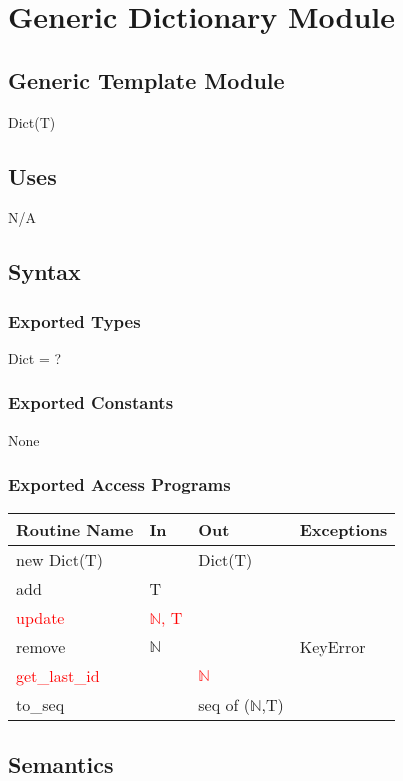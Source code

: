 \documentclass[12pt, titlepage]{article}
\begin{document}
\newpage

\section*{Generic Dictionary Module}

\subsection*{Generic Template Module}
Dict(T)

\subsection*{Uses}
N/A

\subsection*{Syntax}
\subsubsection*{Exported Types}
Dict = ?

\subsubsection*{Exported Constants}
None

\subsubsection* {Exported Access Programs}
\begin{tabular}{|p{3cm}|p{3cm}|p{3cm}|p{4.5cm}|}
    \hline
    \textbf{Routine Name} & \textbf{In} & \textbf{Out} & \textbf{Exceptions} \\
    \hline
    new Dict(T) & & Dict(T) &\\
    \hline
    add & T & &\\
    \hline
    \textcolor{red}{update} & \textcolor{red}{$\mathbb{N}$, T} & &\\
    \hline
    remove & $\mathbb{N}$ & & KeyError\\
    \hline
    \textcolor{red}{get\_last\_id} & & \textcolor{red}{$\mathbb{N}$} &\\
    \hline
    to\_seq & & seq of ($\mathbb{N}$,T) & \\
    \hline
\end{tabular}

\subsection*{Semantics}
\end{document}
